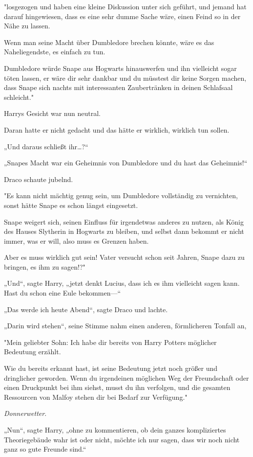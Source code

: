 {"losgezogen und haben eine kleine Diskussion unter sich geführt, und jemand hat darauf hingewiesen, dass es eine sehr dumme Sache wäre, einen Feind so in der Nähe zu lassen.

Wenn man seine Macht über Dumbledore brechen könnte, wäre es das Naheliegendste, es einfach zu tun.

Dumbledore würde Snape aus Hogwarts hinauswerfen und ihn vielleicht sogar töten lassen, er wäre dir sehr dankbar und du müsstest dir keine Sorgen machen, dass Snape sich nachts mit interessanten Zaubertränken in deinen Schlafsaal schleicht."

Harrys Gesicht war nun neutral.

Daran hatte er nicht gedacht und das hätte er wirklich, wirklich tun sollen.

„Und daraus schließt ihr…?“

„Snapes Macht war ein Geheimnis von Dumbledore und du hast das Geheimnis!“

Draco schaute jubelnd.

"Es kann nicht mächtig genug sein, um Dumbledore vollständig zu vernichten, sonst hätte Snape es schon längst eingesetzt.

Snape weigert sich, seinen Einfluss für irgendetwas anderes zu nutzen, als König des Hauses Slytherin in Hogwarts zu bleiben, und selbst dann bekommt er nicht immer, was er will, also muss es Grenzen haben.

Aber es muss wirklich gut sein! Vater versucht schon seit Jahren, Snape dazu zu bringen, es ihm zu sagen!?"

„Und“, sagte Harry, „jetzt denkt Lucius, dass ich es ihm vielleicht sagen kann. Hast du schon eine Eule bekommen—“

„Das werde ich heute Abend“, sagte Draco und lachte.

„Darin wird stehen“, seine Stimme nahm einen anderen, förmlicheren Tonfall an,

"Mein geliebter Sohn: Ich habe dir bereits von Harry Potters möglicher Bedeutung erzählt.

Wie du bereits erkannt hast, ist seine Bedeutung jetzt noch größer und dringlicher geworden. Wenn du irgendeinen möglichen Weg der Freundschaft oder einen Druckpunkt bei ihm siehst, musst du ihn verfolgen, und die gesamten Ressourcen von Malfoy stehen dir bei Bedarf zur Verfügung."

\emph{Donnerwetter}.

„Nun“, sagte Harry, „ohne zu kommentieren, ob dein ganzes kompliziertes Theoriegebäude wahr ist oder nicht, möchte ich nur sagen, dass wir noch nicht ganz so gute Freunde sind.“

}
